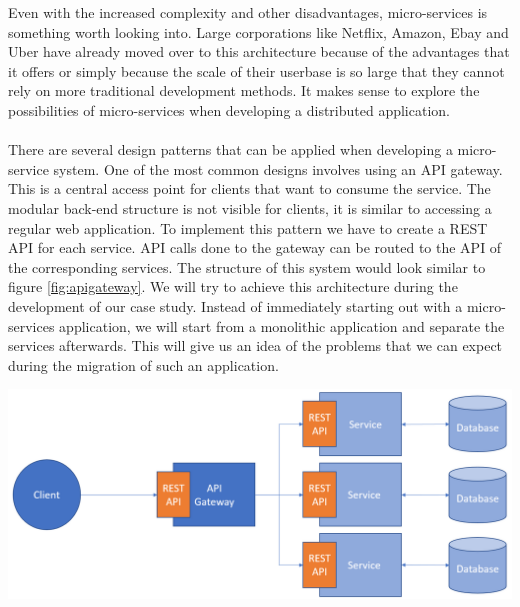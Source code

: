 \documentclass[12pt]{article}
\newenvironment{Figure}
	{\par\medskip\noindent\minipage{\linewidth}}
	{\endminipage\par\medskip}
\begin{document}
\begin{multicols}{2}
Even with the increased complexity and other disadvantages, micro-services is something worth looking into. Large corporations like Netflix, Amazon, Ebay and Uber have already moved over to this architecture because of the advantages that it offers or simply because the scale of their userbase is so large that they cannot rely on more traditional development methods. It makes sense to explore the possibilities of micro-services when developing a distributed application.
\\\\
There are several design patterns that can be applied when developing a micro-service system. \cite{MicroservicePatterns25:online} One of the most common designs involves using an API gateway. This is a central access point for clients that want to consume the service. The modular back-end structure is not visible for clients, it is similar to accessing a regular web application. To implement this pattern we have to create a REST API for each service. API calls done to the gateway can be routed to the API of the corresponding services. The structure of this system would look similar to figure \ref{fig:apigateway}. We will try to achieve this architecture during the development of our case study. Instead of immediately starting out with a micro-services application, we will start from a monolithic application and separate the services afterwards. This will give us an idea of the problems that we can expect during the migration of such an application. 

\begin{Figure}
	\centering
	\includegraphics[width=\linewidth]{illustrations/ApiGateway.png}
	\label{fig:apigateway}
\end{Figure}


\end{multicols}
\end{document}
